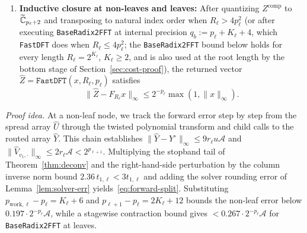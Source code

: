 \begin{lemma}
\begin{enumerate}[label=\textbf{\arabic*.},leftmargin=*]
\begin{equation}
\begin{aligned}
      &\le \frac{1}{2} t_{1,\ell} \, 2^{-p_{\mathrm{work},\ell}} \mathcal{A} + 200 R_\ell \, u \mathcal{A}.
    \end{aligned}
  \end{equation}
  \item \textbf{Inductive closure at non-leaves and leaves:} After quantizing $Z^{\mathrm{comp}}$ to $\widetilde{\mathbb{C}}_{p_\ell + 2}$ and transposing to natural index order when $R_\ell > 4 p_\ell^2$ (or after executing \texttt{BaseRadix2FFT} at internal precision $q_b := p_\ell + K_\ell + 4$, which \texttt{FastDFT} does when $R_\ell \le 4 p_\ell^2$; the \texttt{BaseRadix2FFT} bound below holds for every length $R_\ell = 2^{K_\ell}$, $K_\ell \ge 2$, and is also used at the root length by the bottom stage of Section~\ref{sec:cost-proof}), the returned vector $\widehat{Z} = \texttt{FastDFT}(x, R_\ell, p_\ell)$ satisfies
  \begin{equation}\label{eq:inductive-bound}
    \|\widehat{Z} - F_{R_\ell} x\|_\infty \le 2^{-p_\ell} \max(1, \|x\|_\infty).
  \end{equation}
\end{enumerate}
\end{lemma}

\noindent\emph{Proof idea.} At a non-leaf node, we track the forward error step by step from the spread array $\widehat{U}$ through the twisted polynomial transform and child calls to the routed array $\widehat{Y}$. This chain establishes $\|\widehat{Y} - Y^\circ\|_\infty \le 9 r_\ell u \mathcal{A}$ and $\|\widehat{V}_{v_1, \cdot}\|_\infty \le 2 r_\ell \mathcal{A} < 2^{p_{\ell+1}}$. Multiplying the stopband tail of Theorem~\ref{thm:deconv} and the right-hand-side perturbation by the column inverse norm bound $2.36\,t_{1,\ell} < 3 t_{1,\ell}$ and adding the solver rounding error of Lemma~\ref{lem:solver-err} yields~\eqref{eq:forward-split}. Substituting $p_{\mathrm{work},\ell} - p_\ell = K_\ell + 6$ and $p_{\ell+1} - p_\ell = 2K_\ell + 12$ bounds the non-leaf error below $0.197 \cdot 2^{-p_\ell}\mathcal{A}$, while a stagewise contraction bound gives $< 0.267 \cdot 2^{-p_\ell}\mathcal{A}$ for \texttt{BaseRadix2FFT} at leaves.

